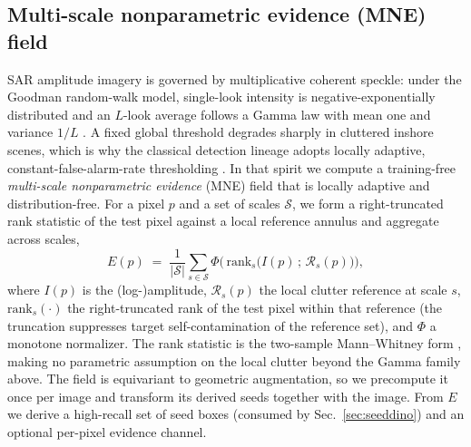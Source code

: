 \documentclass[journal]{IEEEtran}
\begin{document}
\subsection{Multi-scale nonparametric evidence (MNE) field}
\label{sec:mne}
SAR amplitude imagery is governed by multiplicative coherent speckle: under the Goodman random-walk model, single-look intensity is negative-exponentially distributed and an $L$-look average follows a Gamma law with mean one and variance $1/L$ \cite{goodman1976speckle,oliver2004sar}. A fixed global threshold degrades sharply in cluttered inshore scenes, which is why the classical detection lineage adopts locally adaptive, constant-false-alarm-rate thresholding \cite{finn1968cfar}. In that spirit we compute a training-free \emph{multi-scale nonparametric evidence} (MNE) field that is locally adaptive and distribution-free. For a pixel $p$ and a set of scales $\mathcal{S}$, we form a right-truncated rank statistic of the test pixel against a local reference annulus and aggregate across scales,
\begin{equation}
E(p) \;=\; \frac{1}{|\mathcal{S}|}\sum_{s\in\mathcal{S}} \Phi\!\Big(\,\mathrm{rank}_{s}\big(I(p)\,;\,\mathcal{R}_{s}(p)\big)\Big),
\label{eq:mne}
\end{equation}
where $I(p)$ is the (log-)amplitude, $\mathcal{R}_{s}(p)$ the local clutter reference at scale $s$, $\mathrm{rank}_{s}(\cdot)$ the right-truncated rank of the test pixel within that reference (the truncation suppresses target self-contamination of the reference set), and $\Phi$ a monotone normalizer. The rank statistic is the two-sample Mann--Whitney form \cite{mann1947whitney}, making no parametric assumption on the local clutter beyond the Gamma family above. The field is equivariant to geometric augmentation, so we precompute it once per image and transform its derived seeds together with the image. From $E$ we derive a high-recall set of seed boxes (consumed by Sec.~\ref{sec:seeddino}) and an optional per-pixel evidence channel.
\end{document}
